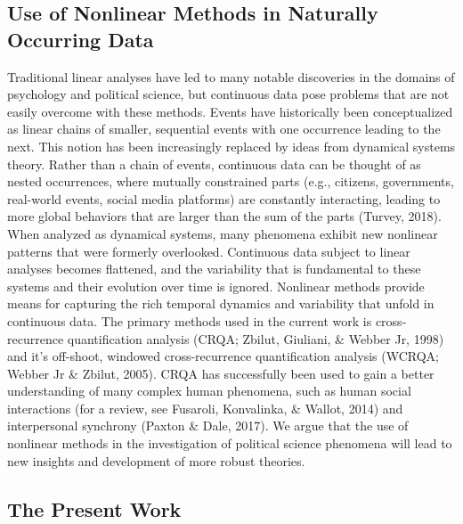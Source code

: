 \documentclass[english,man]{apa6}
\begin{document}
\hypertarget{use-of-nonlinear-methods-in-naturally-occurring-data}{%
\subsection{Use of Nonlinear Methods in Naturally Occurring Data}\label{use-of-nonlinear-methods-in-naturally-occurring-data}}

Traditional linear analyses have led to many notable discoveries in the domains of psychology and political science, but continuous data pose problems that are not easily overcome with these methods. Events have historically been conceptualized as linear chains of smaller, sequential events with one occurrence leading to the next. This notion has been increasingly replaced by ideas from dynamical systems theory. Rather than a chain of events, continuous data can be thought of as nested occurrences, where mutually constrained parts (e.g., citizens, governments, real-world events, social media platforms) are constantly interacting, leading to more global behaviors that are larger than the sum of the parts (Turvey, 2018). When analyzed as dynamical systems, many phenomena exhibit new nonlinear patterns that were formerly overlooked. Continuous data subject to linear analyses becomes flattened, and the variability that is fundamental to these systems and their evolution over time is ignored. Nonlinear methods provide means for capturing the rich temporal dynamics and variability that unfold in continuous data.
The primary methods used in the current work is cross-recurrence quantification analysis (CRQA; Zbilut, Giuliani, \& Webber Jr, 1998) and it's off-shoot, windowed cross-recurrence quantification analysis (WCRQA; Webber Jr \& Zbilut, 2005). CRQA has successfully been used to gain a better understanding of many complex human phenomena, such as human social interactions (for a review, see Fusaroli, Konvalinka, \& Wallot, 2014) and interpersonal synchrony (Paxton \& Dale, 2017). We argue that the use of nonlinear methods in the investigation of political science phenomena will lead to new insights and development of more robust theories.

\hypertarget{the-present-work}{%
\subsection{The Present Work}\label{the-present-work}}
\end{document}
